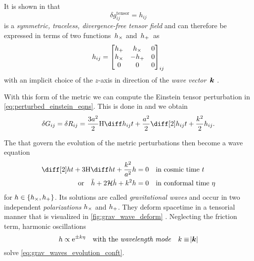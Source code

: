 \documentclass[12pt,parskip=half]{scrreprt}
\begin{document}
It is shown in  that
\begin{equation}
	\delta g^{\mathrm{tensor}}_{ij} = h_{ij}
\end{equation}
is a \emph{symmetric, traceless, divergence-free tensor field} and can therefore be expressed in terms of two functions~\(h_\times\) and~\(h_+\)~as
\begin{equation}
	h_{ij} =
	\begin{bmatrix}
		h_+ & h_\times & 0 \\
		h_\times & -h_+ & 0 \\
		0 & 0 & 0
	\end{bmatrix}_{ij}
\end{equation}
with an implicit choice of the \(z\)-axis in direction of the \emph{wave vector}~\(\boldsymbol{k}\) \autocite{Dodelson}. 

With this form of the metric we can compute the Einstein tensor perturbation in \eqref{eq:perturbed_einstein_eqns}. This is done in  and we obtain
\begin{align}\label{eq:evolution}
	\delta\Gtens_{ij} = \delta\Rtens_{ij} = \frac{3 a^2}{2} \Hcosm \dt{h_{ij}} + \frac{a^2}{2}\ddt{h_{ij}} + \frac{k^2}{2}h_{ij} \eqpunct{.}
\end{align}

The  that govern the evolution of the metric perturbations then become a wave equation
\begin{subequations}\label{eq:grav_waves_evolution}
\begin{align}
	\ddt{h} + 3 \Hcosm \dt{h} + \frac{k^2}{a^2} h &= 0 \quad \text{in cosmic time \(t\)} \\
	\text{or} \quad \ddconf{h} + 2 \Hconf \dconf{h} + k^2 h &= 0 \quad \text{in conformal time \(\conft\)} \label{eq:grav_waves_evolution_conft}
\end{align}
\end{subequations}
for \(h \in \cbr{\hcross, \hplus}\). Its solutions are called \emph{gravitational waves} and occur in two independent \emph{polarizations} \(h_\times\) and \(h_+\). They deform spacetime in a tensorial manner that is visualized in \autoref{fig:grav_wave_deform} \autocite{Schutz}. Neglecting the friction term, harmonic oscillations
\begin{equation}
	h \propto \mathrm{e}^{\pm k \eta} \quad \text{with the \emph{wavelength mode}} \quad k \equiv \abs{\boldsymbol{k}}
\end{equation}
solve \eqref{eq:grav_waves_evolution_conft}.
\end{document}
